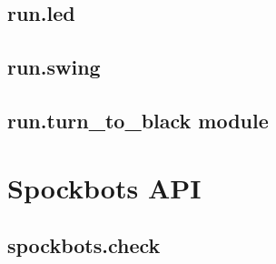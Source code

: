 \documentclass[letterpaper,10pt,english]{sphinxmanual}
\begin{document}
\subsection{run.led}
\label{\detokenize{run:module-run.led}}\label{\detokenize{run:run-led}}

\begin{fulllineitems}
\label{\detokenize{run:run.led.run_led}}
\end{fulllineitems}



\subsection{run.swing}
\label{\detokenize{run:module-run.swing}}\label{\detokenize{run:run-swing}}

\begin{fulllineitems}
\label{\detokenize{run:run.swing.run_swing}}
\end{fulllineitems}



\subsection{run.turn\_to\_black module}
\label{\detokenize{run:run-turn-to-black-module}}

\section{Spockbots API}
\label{\detokenize{spockbots:spockbots-api}}\label{\detokenize{spockbots::doc}}

\subsection{spockbots.check}
\label{\detokenize{spockbots:module-spockbots.check}}\label{\detokenize{spockbots:spockbots-check}}
\end{document}
